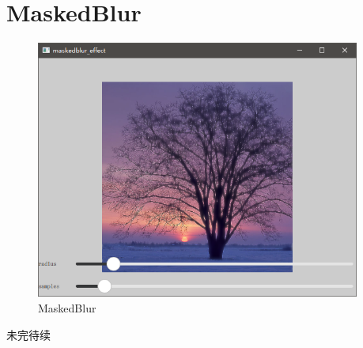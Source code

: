 ﻿




\FloatBarrier
\section{
MaskedBlur
}\label{c000015s000018}


\begin{figure}[htb] %
\marginnote{\setlength\fboxsep{2pt}\fbox{\footnotesize{\kaishu\figurename\,}\footnotesize{\ref{p000034}}}}\centering %
\includegraphics[width=0.95\textwidth]{../chapter06/maskedblur_effect/the_app.png} %
\caption{MaskedBlur} %
\label{p000034} %
\end{figure}


未完待续









